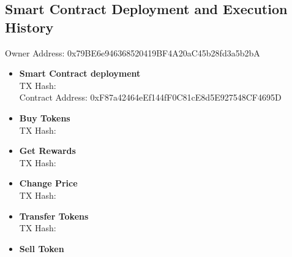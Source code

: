 \documentclass[12pt,a4paper]{article}
\begin{document}
\subsection*{Smart Contract Deployment and Execution History}

Owner Address: 0x79BE6e946368520419BF4A20aC45b28fd3a5b2bA

\begin{itemize}
    \item \textbf{Smart Contract deployment} \\
    
    TX Hash: \\
    Contract Address: 0xF87a42464eEf144fF0C81cE8d5E927548CF4695D \\

    \item \textbf{Buy Tokens} \\
    
    TX Hash:

    \item \textbf{Get Rewards} \\

    TX Hash:

    \item \textbf{Change Price} \\
    
    TX Hash:
    
    \item \textbf{Transfer Tokens} \\
    
    TX Hash:

    \item \textbf{Sell Token} \\
\end{itemize}
\end{document}
